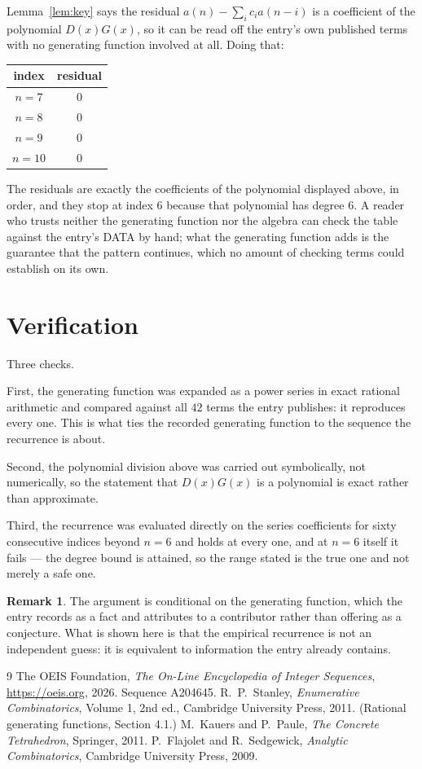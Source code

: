 \documentclass[11pt,a4paper]{article}
\theoremstyle{plain}
\theoremstyle{definition}
\newtheorem{remark}[theorem]{Remark}
\begin{document}
Lemma~\ref{lem:key} says the residual $a(n)-\sum_ic_ia(n-i)$ is a coefficient of the
polynomial $D(x)G(x)$, so it can be read off the entry's own published terms with no
generating function involved at all. Doing that:
\begin{center}
\begin{tabular}{cc}
index & residual \\ \hline
$n=7$ & $0$ \\
$n=8$ & $0$ \\
$n=9$ & $0$ \\
$n=10$ & $0$
\end{tabular}
\end{center}
The residuals are exactly the coefficients of the polynomial displayed above, in order, and
they stop at index $6$ because that polynomial has degree $6$. A reader who trusts
neither the generating function nor the algebra can check the table against the entry's DATA
by hand; what the generating function adds is the guarantee that the pattern continues, which
no amount of checking terms could establish on its own.

\section{Verification}

Three checks.

First, the generating function was expanded as a power series in exact rational arithmetic and
compared against all $42$ terms the entry publishes: it reproduces every one. This is
what ties the recorded generating function to the sequence the recurrence is about.

Second, the polynomial division above was carried out symbolically, not numerically, so the
statement that $D(x)G(x)$ is a polynomial is exact rather than approximate.

Third, the recurrence was evaluated directly on the series coefficients for sixty consecutive
indices beyond $n=6$ and holds at every one, and at $n=6$ itself it fails --- the
degree bound is attained, so the range stated is the true one and not merely a safe one.

\begin{remark}
The argument is conditional on the generating function, which the entry records as a fact and
attributes to a contributor rather than offering as a conjecture. What is shown here is that
the empirical recurrence is not an independent guess: it is equivalent to information the
entry already contains.
\end{remark}

\begin{thebibliography}{9}
 The OEIS Foundation, \emph{The On-Line Encyclopedia of Integer
Sequences}, \url{https://oeis.org}, 2026. Sequence A204645.
 R.~P.~Stanley, \emph{Enumerative Combinatorics}, Volume 1, 2nd ed.,
Cambridge University Press, 2011. (Rational generating functions, Section 4.1.)
 M.~Kauers and P.~Paule, \emph{The Concrete Tetrahedron}, Springer, 2011.
 P.~Flajolet and R.~Sedgewick, \emph{Analytic Combinatorics}, Cambridge
University Press, 2009.
\end{thebibliography}
\end{document}
